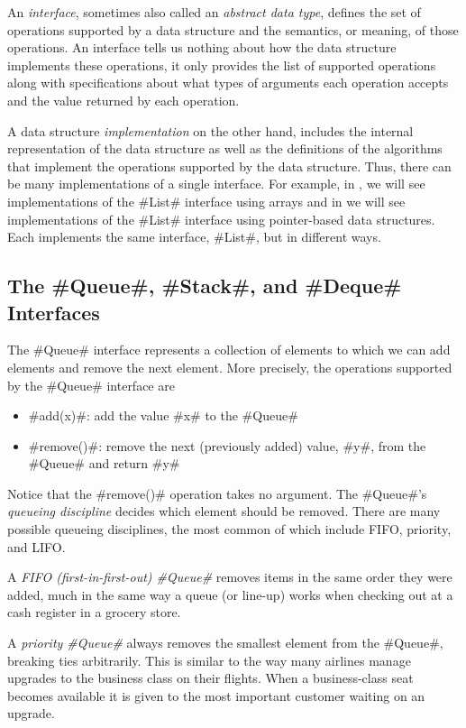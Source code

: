 An \emph{interface}, sometimes also called an \emph{abstract data type},
defines the set of operations supported by a data structure and
the semantics, or meaning, of those operations.  An interface tells us
nothing about how the data structure implements these operations, it only
provides the list of supported operations along with specifications
about what types of arguments each operation accepts and the value
returned by each operation.

A data structure \emph{implementation} on the other hand, includes the
internal representation of the data structure as well as the definitions
of the algorithms that implement the operations supported by the data
structure.  Thus, there can be many implementations of a single interface.
For example, in , we will see implementations of the
#List# interface using arrays and in  we will
see implementations of the #List# interface using pointer-based data
structures.  Each implements the same interface, #List#,
but in different ways.

\subsection{The #Queue#, #Stack#, and #Deque# Interfaces}

The #Queue# interface represents a collection of elements to which we
can add elements and remove the next element.  More precisely, the operations
supported by the #Queue# interface are
\begin{itemize}
  \item #add(x)#: add the value #x# to the #Queue#
  \item #remove()#: remove the next (previously added) value, #y#, from the #Queue# and return #y#
\end{itemize}
Notice that the #remove()# operation takes no argument.  The #Queue#'s
\emph{queueing discipline} decides which element should be removed.
There are many possible queueing disciplines, the most common of which
include FIFO, priority, and LIFO.

A \emph{FIFO (first-in-first-out) #Queue#} removes items in the same
order they were added, much in the same way a queue (or line-up) works
when checking out at a cash register in a grocery store.

A \emph{priority #Queue#} always removes the smallest element from
the #Queue#, breaking ties arbitrarily.  This is similar to the way
many airlines manage upgrades to the business class on their flights.
When a business-class seat becomes available it is given to the most
important customer waiting on an upgrade.

